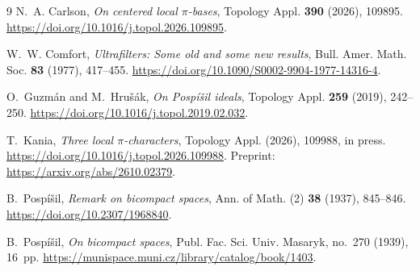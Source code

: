 \documentclass[10pt,a4paper]{amsart}
\theoremstyle{definition}
\theoremstyle{remark}
\begin{document}
\begin{thebibliography}{9}
N.~A. Carlson, \emph{On centered local $\pi$-bases},
Topology Appl. \textbf{390} (2026), 109895.
\url{https://doi.org/10.1016/j.topol.2026.109895}.

W.~W. Comfort, \emph{Ultrafilters: Some old and some new results},
Bull. Amer. Math. Soc. \textbf{83} (1977), 417--455.
\url{https://doi.org/10.1090/S0002-9904-1977-14316-4}.

O.~Guzm\'an and M.~Hru\v{s}\'ak, \emph{On Posp\'i\v{s}il ideals},
Topology Appl. \textbf{259} (2019), 242--250.
\url{https://doi.org/10.1016/j.topol.2019.02.032}.

T.~Kania, \emph{Three local $\pi$-characters},
Topology Appl. (2026), 109988, in press.
\url{https://doi.org/10.1016/j.topol.2026.109988}.
Preprint: \url{https://arxiv.org/abs/2610.02379}.

B.~Posp\'i\v{s}il, \emph{Remark on bicompact spaces},
Ann. of Math. (2) \textbf{38} (1937), 845--846.
\url{https://doi.org/10.2307/1968840}.

B.~Posp\'i\v{s}il, \emph{On bicompact spaces},
Publ. Fac. Sci. Univ. Masaryk, no.~270 (1939), 16~pp.
\url{https://munispace.muni.cz/library/catalog/book/1403}.
\end{thebibliography}
\end{document}
